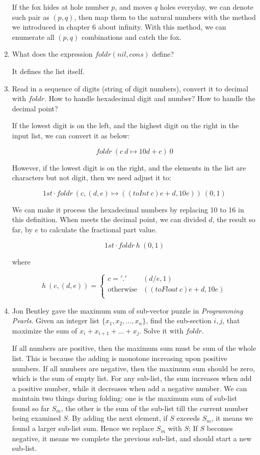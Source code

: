 \documentclass[UTF8]{article}
\begin{document}
\begin{enumerate}
If the fox hides at hole number $p$, and moves $q$ holes everyday, we can denote such pair as $(p, q)$, then map them to the natural numbers with the method we introduced in chapter 6 about infinity. With this method, we can enumerate all $(p, q)$ combinations and catch the fox.

\item What does the expression $foldr(nil, cons)$ define?

It defines the list itself.

\item Read in a sequence of digits (string of digit numbers), convert it to decimal with $foldr$. How to handle hexadecimal digit and number? How to handle the decimal point?

If the lowest digit is on the left, and the highest digit on the right in the input list, we can convert it as below:

\[
foldr\ (c\ d \mapsto 10d + c)\ 0
\]

However, if the lowest digit is on the right, and the elements in the list are characters but not digit, then we need adjust it to:

\[
1st \cdot foldr\ (c, (d, e) \mapsto ((toInt\ c)e + d, 10e))\ (0, 1)
\]

We can make it process the hexadecimal numbers by replacing 10 to 16 in this definition. When meets the decimal point, we can divided $d$, the result so far, by $e$ to calculate the fractional part value.

\[
1st \cdot foldr\ h\ (0, 1)
\]

where

\[
h\ (c, (d, e)) = \begin{cases}
c = '.' & (d / e, 1) \\
\text{otherwise} & ((toFloat\ c)e + d, 10e) \\
\end{cases}
\]

\item Jon Bentley gave the maximum sum of sub-vector puzzle in {\em Programming Pearls}. Given an integer list $\{x_1, x_2, ..., x_n\}$, find the sub-section $i, j$, that maximize the sum of $x_i + x_{i+1} + ... + x_j$. Solve it with $foldr$.

If all numbers are positive, then the maximum sum must be sum of the whole list. This is because the adding is monotone increasing upon positive numbers. If all numbers are negative, then the maximum sum should be zero, which is the sum of empty list. For any sub-list, the sum increases when add a positive number, while it decreases when add a negative number. We can maintain two things during folding: one is the maximum sum of sub-list found so far $S_m$, the other is the sum of the sub-list till the current number being examined $S$. By adding the next element, if $S$ exceeds $S_m$, it means we found a larger sub-list sum. Hence we replace $S_m$ with $S$; If $S$ becomes negative, it means we complete the previous sub-list, and should start a new sub-list.


\end{enumerate}
\end{document}
